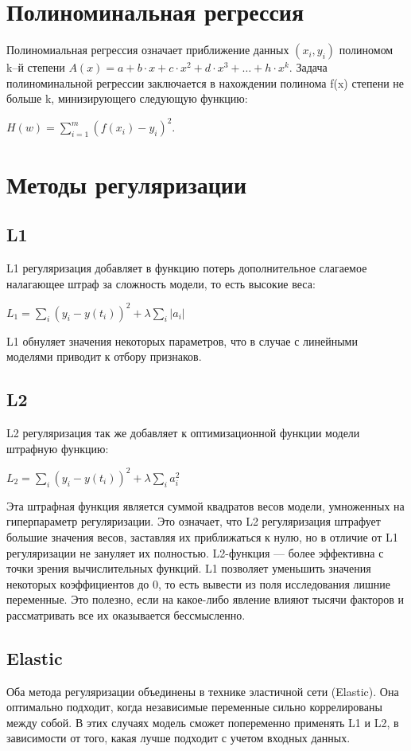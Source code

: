\documentclass{article}
\begin{document}
\section*{Полиноминальная регрессия}

Полиномиальная регрессия означает приближение данных $(x_i,y_i)$ полиномом k–й степени $A(x)=a+b \cdot x + c \cdot x^2 + d \cdot x^3 +…+ h \cdot x^k. $ Задача полиноминальной регрессии заключается в нахождении полинома f(x) степени не больше k, минизирующего следующую функцию:
\begin{center}
    $H(w) = \displaystyle \sum_{i=1}^{m}(f(x_i) - y_i)^2.$
\end{center}
\section*{Методы регуляризации}
\subsection*{L1}
L1 регуляризация добавляет в функцию потерь дополнительное слагаемое налагающее штраф за сложность модели, то есть высокие веса:
\begin{center}
    $L_1 =  \displaystyle \sum_{i}^{}(y_i - y(t_i))^2 + \lambda \sum_{i}^{}|a_i|$
\end{center}
L1 обнуляет значения некоторых параметров, что в случае с линейными моделями приводит к отбору признаков.

\subsection*{L2}
L2 регуляризация так же добавляет к оптимизационной функции модели штрафную функцию:
\begin{center}
    $L_2 =  \displaystyle \sum_{i}^{}(y_i - y(t_i))^2 + \lambda \sum_{i}^{}a_i^2$
\end{center}
Эта штрафная функция является суммой квадратов весов модели, умноженных на гиперпараметр регуляризации. Это означает, что L2 регуляризация штрафует большие значения весов, заставляя их приближаться к нулю, но в отличие от L1 регуляризации не зануляет их полностью.
L2-функция — более эффективна с точки зрения вычислительных функций. L1 позволяет уменьшить значения некоторых коэффициентов до 0, то есть вывести из поля исследования лишние переменные. Это полезно, если на какое-либо явление влияют тысячи факторов и рассматривать все их оказывается бессмысленно.
\subsection*{Elastic}
Оба метода регуляризации объединены в технике эластичной сети (Elastic). Она оптимально подходит, когда независимые переменные сильно коррелированы между собой. В этих случаях модель сможет попеременно применять L1 и L2, в зависимости от того, какая лучше подходит с учетом входных данных.
\end{document}
